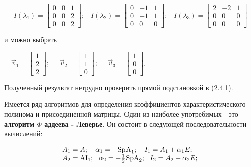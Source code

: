 \begin{equation*}
I(\lambda _1)=\left[\begin{matrix}0&0&1\\0&0&2\\0&0&2\end{matrix}\right];\;\;\;I(\lambda _2)=\left[\begin{matrix}0&-1&1\\0&-1&1\\0&0&0\end{matrix}\right];\;\;\;I(\lambda _3)=\left[\begin{matrix}2&-2&1\\0&0&0\\0&0&0\end{matrix}\right]
\end{equation*}

		и можно выбрать



		\ \  $\vec v_1=\left[\begin{matrix}1\\2\\2\end{matrix}\right];\;\;\;\;\;\vec
		v_2=\left[\begin{matrix}1\\1\\0\end{matrix}\right];\;\;\;\;\;\vec v_3=\left[\begin{matrix}1\\0\\0\end{matrix}\right]$.



		Полученный результат нетрудно проверить прямой подстановкой в (2.4.1).



		Имеется ряд алгоритмов для определения коэффициентов характеристического полинома и присоединенной матрицы. Один из
		наиболее употребимых - это \textbf{алгоритм $ \Phi $ аддеева - Леверье}. Он состоит в следующей последовательности вычислений:


\begin{equation*}
\begin{matrix}A_1=A;\ \ \ \alpha _1=-\normalsubformula{\text{SpA}}_1;\ \ \ I_1=A_1+\alpha _1E;\hfill\null
\\A_2=\normalsubformula{\text{AI}}_1;\ \ \alpha _2=-\frac 1 2\normalsubformula{\text{SpA}}_2;\ \ I_2=A_2+\alpha _2E;\hfill\null
\end{matrix}\hfill 
\end{equation*}


